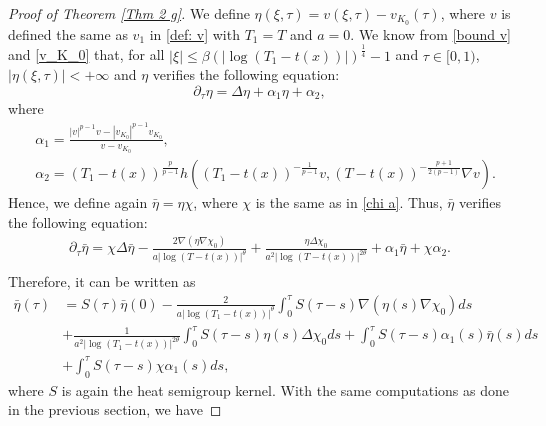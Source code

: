 \documentclass[10pt,a4paper]{amsart}
\begin{document}
\begin{proof}[Proof of Theorem \ref{Thm 2 g}]
We define $\eta(\xi,\tau)=v(\xi,\tau)-v_{K_0}(\tau)$, where $v$ is defined the same as $v_1$ in \eqref{def: v} with $T_1=T$ and $a=0$. We know from \eqref{bound v} and \eqref{v_K_0} that, for all $|\xi|\leq\beta (|\log(T_1-t(x))|)^{\frac{1}{4}}-1$ and $\tau \in [0,1)$, $|\eta(\xi,\tau)|<+\infty$ and $\eta$ verifies the following equation:
$$\partial_\tau \eta=\Delta \eta+\alpha_1 \eta+\alpha_2,$$
where 
\begin{equation*}
\begin{split}
&\alpha_1=\frac{|v|^{p-1}v-|v_{K_0}|^{p-1}v_{K_0}}{v-v_{K_0}},\\
&\alpha_2=(T_1-t(x))^{\frac{p}{p-1}}h\left((T_1-t(x))^{-\frac{1}{p-1}}v,(T-t(x))^{-\frac{p+1}{2(p-1)}}\nabla v\right).
\end{split}
\end{equation*}
Hence, we define again $\bar{\eta}=\eta \chi$, where $\chi$ is the same as in \eqref{chi a}. Thus, $\bar\eta$ verifies the following equation:
\begin{equation*}
\begin{split}
\partial_\tau \bar{\eta}=\chi \Delta \bar{\eta}-\frac{2\nabla(\eta\nabla \chi_0)}{a|\log (T-t(x))|^{\theta}}+\frac{\eta \Delta \chi_0}{a^2|\log (T-t(x))|^{2\theta}}+\alpha_1\bar{\eta}+\chi \alpha_2.\\
\end{split}
\end{equation*}
Therefore, it can be written as
\begin{equation*}
\begin{split}
\bar{\eta}(\tau)&=S(\tau) \bar{\eta}(0)-\frac{2}{a|\log (T_1-t(x))|^{\theta}}\int^\tau_0S(\tau-s)\nabla(\eta(s)\nabla \chi_0)ds\\
&+\frac{1}{a^2|\log (T_1-t(x))|^{2\theta}}\int^\tau_0S(\tau-s)\eta(s) \Delta \chi_0ds+\int^\tau_0 S(\tau-s)\alpha_1(s)\bar{\eta}(s)ds\\
&+\int^\tau_0 S(\tau-s)\chi\alpha_1(s)ds,
\end{split}
\end{equation*}
where $S$ is again the heat semigroup kernel. With the same computations as done in the previous section, we have



\end{proof}
\end{document}
